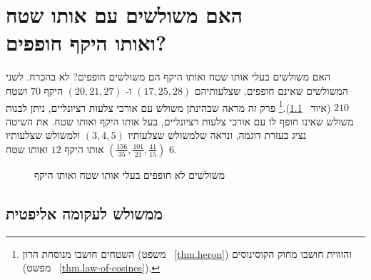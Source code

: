 


\chapter[\R{האם משולשים בעלי אותו שטח ואותו היקף הם משולשים חופפים?}]{האם משולשים עם אותו שטח\\
ואותו היקף חופפים?}
\label{c.congruent}


האם משולשים בעלי אותו שטח ואותו היקף הם משולשים חופפים? לא בהכרח. לשני המשולשים שאינם חופפים, שצלעותיהם
$(17,25,28)$
ו-%
$(20,21,27)$
היקף
$70$
ושטח 
$210$
(איור%
~\ref{f.congruent-first-example}).\footnote{%
השטחים חושבו מנוסחת הרון (משפט%
~\ref{thm.heron})
והזווית חושבו מחוק הקוסינוסים (מפשט%
~\ref{thm.law-of-cosines}).} 
פרק זה מראה שבהינתן משולש עם אורכי צלעות רציונליים, ניתן לבנות משולש שאינו חופף לו עם אורכי צלעות רציונליים, בעל אותו היקף ואותו שטח. את השיטה נציג בעזרת דוגמה, ונראה שלמשולש שצלעותיו 
$(3,4,5)$
ולמשולש שצלעותיו
$(\frac{156}{35},\frac{101}{21},\frac{41}{15})$
אותו היקף
$12$
ואותו שטח
$6$.

\begin{figure}[tb]
\begin{center}
\end{center}
\caption{משולשים לא חופפים בעלי אותו שטח ואותו היקף}\label{f.congruent-first-example}
\end{figure}

\section{ממשולש לעקומה אליפטית}

